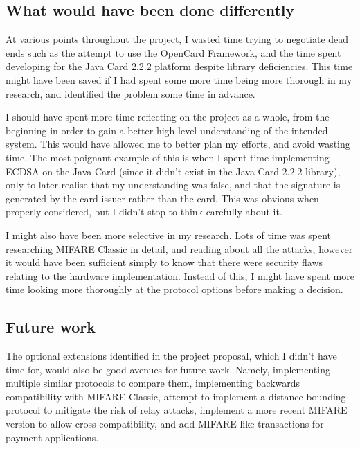 \documentclass[12pt]{article}
\begin{document}
\subsection{What would have been done differently}
At various points throughout the project, I wasted time trying to negotiate dead ends such as the attempt to use the OpenCard Framework, and the time spent developing for the Java Card 2.2.2 platform despite library deficiencies. This time might have been saved if I had spent some more time being more thorough in my research, and identified the problem some time in advance.

I should have spent more time reflecting on the project as a whole, from the beginning in order to gain a better high-level understanding of the intended system. This would have allowed me to better plan my efforts, and avoid wasting time. The most poignant example of this is when I spent time implementing ECDSA on the Java Card (since it didn't exist in the Java Card 2.2.2 library), only to later realise that my understanding was false, and that the signature is generated by the card issuer rather than the card. This was obvious when properly considered, but I didn't stop to think carefully about it.

I might also have been more selective in my research. Lots of time was spent researching MIFARE Classic in detail, and reading about all the attacks, however it would have been sufficient simply to know that there were security flaws relating to the hardware implementation. Instead of this, I might have spent more time looking more thoroughly at the protocol options before making a decision.

\subsection{Future work}

The optional extensions identified in the project proposal, which I didn't have time for, would also be good avenues for future work. Namely, implementing multiple similar protocols to compare them, implementing backwards compatibility with MIFARE Classic, attempt to implement a distance-bounding protocol to mitigate the risk of relay attacks, implement a more recent MIFARE version to allow cross-compatibility, and add MIFARE-like transactions for payment applications.
\end{document}
